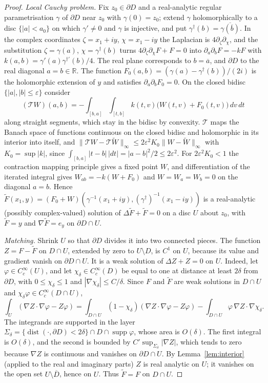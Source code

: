 \documentclass[11pt]{amsart}
\theoremstyle{definition}
\theoremstyle{remark}
\numberwithin{equation}{section}
\newcommand{\R}{\mathbb{R}}
\newcommand{\eps}{\varepsilon}
\DeclareMathOperator{\dist}{dist}
\newcommand{\nrm}[1]{\lVert #1\rVert}
\begin{document}
\begin{proof}
\emph{Local Cauchy problem.} Fix $z_0\in\partial D$ and a real-analytic regular parametrisation $\gamma$ of $\partial D$ near $z_0$ with $\gamma(0)=z_0$; extend $\gamma$ holomorphically to a disc $\{|a|<a_0\}$ on which $\gamma'\neq0$ and $\gamma$ is injective, and put $\gamma^\dagger(b)=\overline{\gamma(\overline b)}$. In the complex coordinates $\zeta=x_1+iy$, $\chi=x_1-iy$ the Laplacian is $4\partial_\zeta\partial_\chi$, and the substitution $\zeta=\gamma(a)$, $\chi=\gamma^\dagger(b)$ turns $4\partial_\zeta\partial_\chi F+F=0$ into $\partial_a\partial_bF=-kF$ with $k(a,b)=\gamma'(a)\gamma^{\dagger\prime}(b)/4$. The real plane corresponds to $b=\overline a$, and $\partial D$ to the real diagonal $a=b\in\R$. The function $F_0(a,b)=(\gamma(a)-\gamma^\dagger(b))/(2i)$ is the holomorphic extension of $y$ and satisfies $\partial_a\partial_bF_0=0$. On the closed bidisc $\{|a|,|b|\leq\eps\}$ consider
\[
(\mathcal TW)(a,b)=-\int_{[b,a]}\int_{[t,b]}k(t,v)\big(W(t,v)+F_0(t,v)\big)\,dv\,dt
\]
along straight segments, which stay in the bidisc by convexity. $\mathcal T$ maps the Banach space of functions continuous on the closed bidisc and holomorphic in its interior into itself, and $\nrm{\mathcal TW-\mathcal T\widetilde W}_\infty\leq2\eps^2K_0\nrm{W-\widetilde W}_\infty$ with $K_0=\sup|k|$, since $\int_{[b,a]}|t-b|\,|dt|=|a-b|^2/2\leq2\eps^2$. For $2\eps^2K_0<1$ the contraction mapping principle gives a fixed point $W$, and differentiation of the iterated integral gives $W_{ab}=-k(W+F_0)$ and $W=W_a=W_b=0$ on the diagonal $a=b$. Hence $\widetilde F(x_1,y)=(F_0+W)(\gamma^{-1}(x_1+iy),(\gamma^\dagger)^{-1}(x_1-iy))$ is a real-analytic (possibly complex-valued) solution of $\Delta\widetilde F+\widetilde F=0$ on a disc $U$ about $z_0$, with $\widetilde F=y$ and $\nabla\widetilde F=e_y$ on $\partial D\cap U$.

\emph{Matching.} Shrink $U$ so that $\partial D$ divides it into two connected pieces. The function $Z=F-\widetilde F$ on $D\cap U$, extended by zero to $U\setminus D$, is $C^1$ on $U$, because its value and gradient vanish on $\partial D\cap U$. It is a weak solution of $\Delta Z+Z=0$ on $U$. Indeed, let $\varphi\in C_c^\infty(U)$, and let $\chi_\delta\in C_c^\infty(D)$ be equal to one at distance at least $2\delta$ from $\partial D$, with $0\leq\chi_\delta\leq1$ and $|\nabla\chi_\delta|\leq C/\delta$. Since $F$ and $\widetilde F$ are weak solutions in $D\cap U$ and $\chi_\delta\varphi\in C_c^\infty(D\cap U)$,
\[
\int_U(\nabla Z\cdot\nabla\varphi-Z\varphi)=\int_{D\cap U}(1-\chi_\delta)(\nabla Z\cdot\nabla\varphi-Z\varphi)-\int_{D\cap U}\varphi\,\nabla Z\cdot\nabla\chi_\delta .
\]
The integrands are supported in the layer $\Sigma_\delta=\{\dist(\cdot,\partial D)<2\delta\}\cap D\cap\operatorname{supp}\varphi$, whose area is $O(\delta)$. The first integral is $O(\delta)$, and the second is bounded by $C'\sup_{\Sigma_\delta}|\nabla Z|$, which tends to zero because $\nabla Z$ is continuous and vanishes on $\partial D\cap U$. By Lemma~\ref{lem:interior} (applied to the real and imaginary parts) $Z$ is real analytic on $U$; it vanishes on the open set $U\setminus\overline D$, hence on $U$. Thus $\widetilde F=F$ on $D\cap U$.


\end{proof}
\end{document}
